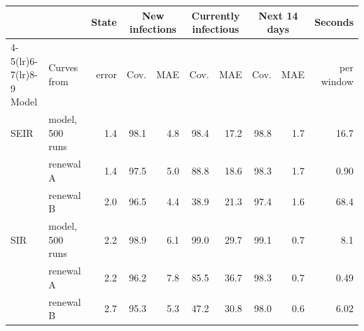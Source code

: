 \begin{tabular}{llrrrrrrrr}
\toprule
 &  & State & \multicolumn{2}{c}{New infections} & \multicolumn{2}{c}{Currently infectious} & \multicolumn{2}{c}{Next 14 days} & Seconds \\
\cmidrule(lr){4-5}\cmidrule(lr){6-7}\cmidrule(lr){8-9}
Model & Curves from & error & Cov. & MAE & Cov. & MAE & Cov. & MAE & per window \\
\midrule
SEIR & model, 500 runs & 1.4 & 98.1 & 4.8 & 98.4 & 17.2 & 98.8 & 1.7 & 16.7 \\
 & renewal A & 1.4 & 97.5 & 5.0 & 88.8 & 18.6 & 98.3 & 1.7 & 0.90 \\
 & renewal B & 2.0 & 96.5 & 4.4 & 38.9 & 21.3 & 97.4 & 1.6 & 68.4 \\
\midrule
SIR & model, 500 runs & 2.2 & 98.9 & 6.1 & 99.0 & 29.7 & 99.1 & 0.7 & 8.1 \\
 & renewal A & 2.2 & 96.2 & 7.8 & 85.5 & 36.7 & 98.3 & 0.7 & 0.49 \\
 & renewal B & 2.7 & 95.3 & 5.3 & 47.2 & 30.8 & 98.0 & 0.6 & 6.02 \\
\bottomrule
\end{tabular}
